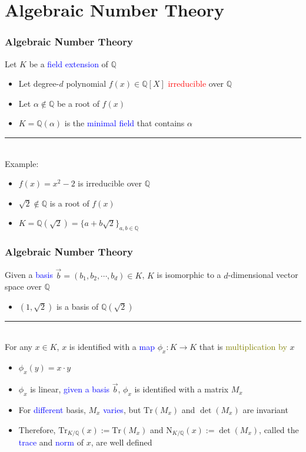 \documentclass{beamer}
\newcommand{\blue}[1]{\textcolor{blue}{#1}}
\newcommand{\dgreen}[1]{\textcolor{dgreen}{#1}}
\newcommand{\red}[1]{\textcolor{red}{#1}}
\newcommand{\olive}[1]{\textcolor{olive}{#1}}
\newcommand{\bbQ}{\mathbb{Q}}
\newcommand{\Tr}{\mathrm{Tr}}
\newcommand{\TrKQ}{\mathrm{Tr}_{K/\mathbb{Q}}}
\newcommand{\NKQ}{\mathrm{N}_{K/\mathbb{Q}}}
\begin{document}
\section{Algebraic Number Theory}
\frame
{
  \frametitle{Algebraic Number Theory}
  Let $K$ be a \blue{field extension} of $\bbQ$
  \begin{itemize}
  	\item Let degree-$d$ polynomial $f(x)\in\bbQ[X]$ \red{irreducible} over $\bbQ$
  	\item Let $\alpha\notin\bbQ$ be a \dgreen{root} of $f(x)$
  	\item $K=\bbQ(\alpha)$ is the \blue{minimal field} that contains $\alpha$
  \end{itemize}

  \noindent\rule{6cm}{0.4pt}\\
  Example:
  \begin{itemize}
  	\item $f(x)=x^2-2$ is irreducible over $\bbQ$
  	\item $\sqrt{2}\notin\bbQ$ is a root of $f(x)$
  	\item $K=\bbQ(\sqrt{2})=\{a+b\sqrt{2}\}_{a,b\in\bbQ}$
  \end{itemize}
}

\frame
{
  \frametitle{Algebraic Number Theory}
  Given a \blue{basis} $\vec{b}=(b_1,b_2,\cdots,b_d)\in K$, $K$ is isomorphic to a $d$-dimensional \dgreen{vector space} over $\bbQ$
  \begin{itemize}
  	\item $(1,\sqrt{2})$ is a basis of $\bbQ(\sqrt{2})$
  \end{itemize}

  \noindent\rule{6cm}{0.4pt}\\
  For any $x\in K$, $x$ is identified with a \blue{map} $\phi_x:K\to K$ that is \olive{multiplication by} $x$
  \begin{itemize}
  	\item $\phi_x(y)=x\cdot y$
  	\item $\phi_x$ is linear, \blue{given a basis} $\vec{b}$, $\phi_x$ is \dgreen{identified with a matrix} $M_x$
  	\item For \blue{different} basis, $M_x$ \blue{varies}, but $\Tr(M_x)$ and $\det(M_x)$ are \dgreen{invariant}
  	\item Therefore, $\TrKQ(x):=\Tr(M_x)$ and $\NKQ(x):=\det(M_x)$, called the \blue{trace} and \blue{norm} of $x$, are \dgreen{well defined}
  \end{itemize}
}
\end{document}
